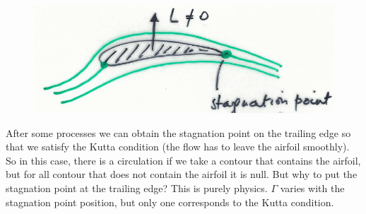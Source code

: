 		\begin{figure}
		\vspace{-5mm}
		\includegraphics[scale=0.25]{ch1/4}
		\end{figure}
		After some processes we can obtain the stagnation point on the trailing edge so that we satisfy the Kutta condition (the flow has to leave the airfoil smoothly). So in this case, there is a circulation if we take a contour that contains the airfoil, but for all contour that does not contain the airfoil it is null. But why to put the stagnation point at the trailing edge? This is purely physics. $\Gamma$ varies with the stagnation point position, but only one corresponds to the Kutta condition. \\
		
